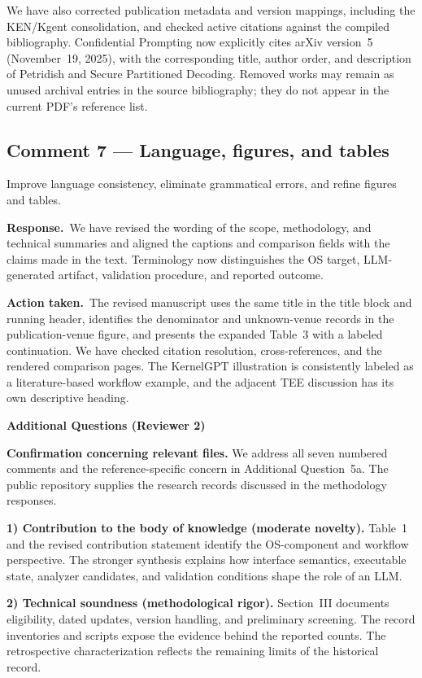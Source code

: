 \documentclass[11pt,a4paper]{article}
\newcommand{\response}{\par\textbf{Response.}\ }
\newcommand{\action}{\par\textbf{Action taken.}\ }
\newcommand{\additional}[1]{\par\Needspace{5\baselineskip}\vspace{5pt}\textbf{Additional Questions (Reviewer #1)}\par}
\begin{document}
We have also corrected publication metadata and version mappings, including the KEN/Kgent consolidation, and checked active citations against the compiled bibliography. Confidential Prompting now explicitly cites arXiv version~5 (November~19, 2025), with the corresponding title, author order, and description of Petridish and Secure Partitioned Decoding. Removed works may remain as unused archival entries in the source bibliography; they do not appear in the current PDF's reference list.

\subsection{Comment 7 --- Language, figures, and tables}
\begin{reviewcomment}
Improve language consistency, eliminate grammatical errors, and refine figures and tables.
\end{reviewcomment}

\response We have revised the wording of the scope, methodology, and technical summaries and aligned the captions and comparison fields with the claims made in the text. Terminology now distinguishes the OS target, LLM-generated artifact, validation procedure, and reported outcome.

\action The revised manuscript uses the same title in the title block and running header, identifies the denominator and unknown-venue records in the publication-venue figure, and presents the expanded Table~3 with a labeled continuation. We have checked citation resolution, cross-references, and the rendered comparison pages. The KernelGPT illustration is consistently labeled as a literature-based workflow example, and the adjacent TEE discussion has its own descriptive heading.

\additional{2}

\textbf{Confirmation concerning relevant files.} We address all seven numbered comments and the reference-specific concern in Additional Question~5a. The public repository supplies the research records discussed in the methodology responses.

\textbf{1) Contribution to the body of knowledge (moderate novelty).} Table~1 and the revised contribution statement identify the OS-component and workflow perspective. The stronger synthesis explains how interface semantics, executable state, analyzer candidates, and validation conditions shape the role of an LLM.

\textbf{2) Technical soundness (methodological rigor).} Section~III documents eligibility, dated updates, version handling, and preliminary screening. The record inventories and scripts expose the evidence behind the reported counts. The retrospective characterization reflects the remaining limits of the historical record.
\end{document}
